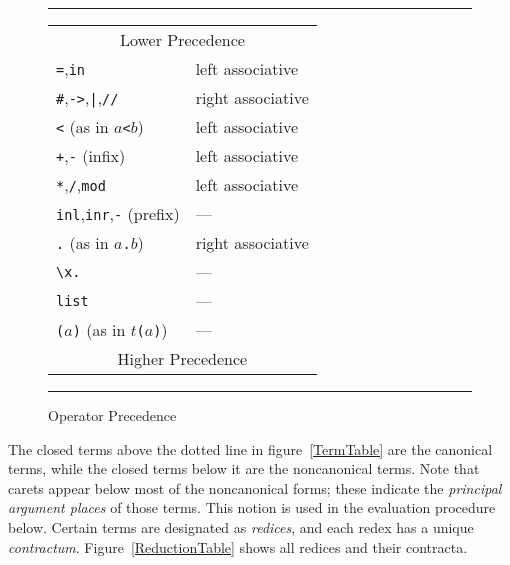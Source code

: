 \begin{figure}
\hrule{}
\vspace{2ex}
\begin{center}
\begin{tabular}{ll}
\multicolumn{2}{c}{Lower Precedence}\\[1ex]
\verb'=',\verb'in'            & left associative \\[1ex]
\verb'#',\verb'->',\verb'|',\verb'//'      & right associative \\[1ex]
\verb'<' (as in {\tt $a$<$b$})             & left associative \\[1ex]
\verb'+',\verb'-' (infix) & left associative \\[1ex]
\verb'*',\verb'/',\verb'mod'         & left associative \\[1ex]
\verb'inl',\verb'inr',\verb'-' (prefix) & ---\\[1ex]
\verb'.' (as in {\tt $a$.$b$})	& right associative \\[1ex]
\verb'\x.' 		& ---  \\[1ex]
\verb'list'            & --- \\[1ex]
{\tt ($a$)} (as in {\tt $t$($a$)}) & --- \\[1ex]
\multicolumn{2}{c}{Higher Precedence}
\end{tabular}
\end{center}
\caption{Operator Precedence}
\label{ParseTable}
\vspace{2pt}
\hrule{}
\end{figure}

The closed terms above the dotted line in figure~\ref{TermTable} are the 
canonical terms, while the closed terms below it
are the noncanonical terms.  Note that
carets appear below most of the noncanonical forms; these indicate the
{\sl principal argument places} of those
terms.  This notion is used in the 
evaluation procedure below.  Certain terms are
designated as {\sl redices}, and each redex has a
unique {\sl contractum}.
Figure~\ref{ReductionTable} shows all redices and their contracta.

